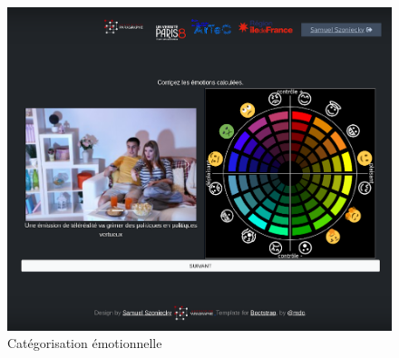 \documentclass[
  a4paper,
  DIV=11,
  numbers=noendperiod]{scrreprt}
\begin{document}
\begin{figure}

\begin{minipage}{0.50\linewidth}



\end{minipage}%
%
\begin{minipage}{0.50\linewidth}

\includegraphics{images/polemikaEmotions1.png}

\end{minipage}%

\caption{\label{fig-polemikaEmotions}Catégorisation émotionnelle}

\end{figure}%
\end{document}
